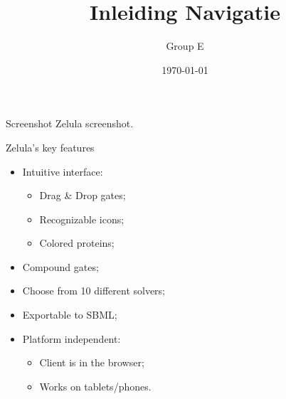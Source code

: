 \documentclass[utf8x,outline]{beamer}
\title{Inleiding Navigatie}
\author{Group E}
\institute{TU Delft}
\date{\today}
\begin{document}
\begin{frame}{Screenshot Zelula}
	screenshot.
\end{frame}
\begin{frame}{Zelula's key features}
	\begin{itemize}
		\item Intuitive interface:
		\begin{itemize}
			\item Drag \& Drop gates;
			\item Recognizable icons;
			\item Colored proteins;
		\end{itemize}
		\item Compound gates;
		\item Choose from 10 different solvers;
		\item Exportable to SBML;
		\item Platform independent:
		\begin{itemize}
			\item Client is in the browser;
			\item Works on tablets/phones.
		\end{itemize}
	\end{itemize}
\end{frame}
\end{document}
